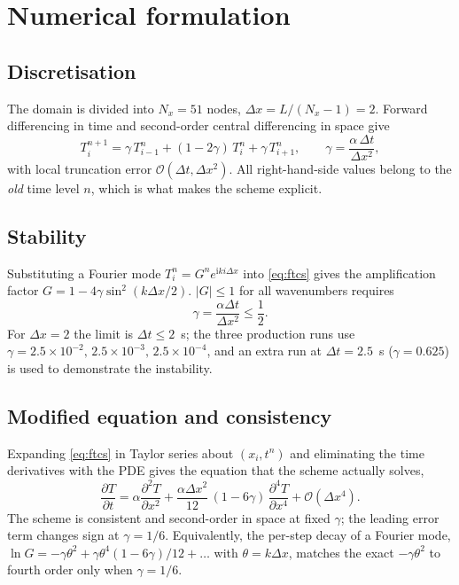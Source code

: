\section{Numerical formulation}
\subsection{Discretisation}
The domain is divided into $N_x=51$ nodes, $\Delta x=L/(N_x-1)=2$. Forward differencing in time and second-order central differencing in space give
\begin{equation}
T_i^{n+1} = \gamma\,T_{i-1}^{n} + (1-2\gamma)\,T_i^{n} + \gamma\,T_{i+1}^{n}, \qquad \gamma=\frac{\alpha\,\Delta t}{\Delta x^2}, \label{eq:ftcs}
\end{equation}
with local truncation error $\mathcal{O}(\Delta t,\Delta x^2)$. All right-hand-side values belong to the \emph{old} time level $n$, which is what makes the scheme explicit.

\subsection{Stability}
Substituting a Fourier mode $T_i^n=G^n e^{\mathrm{i}k i\Delta x}$ into \eqref{eq:ftcs} gives the amplification factor $G=1-4\gamma\sin^2(k\Delta x/2)$. $|G|\le1$ for all wavenumbers requires
\begin{equation}\gamma=\frac{\alpha\Delta t}{\Delta x^2}\le\frac12 .\end{equation}
For $\Delta x=2$ the limit is $\Delta t\le 2$~s; the three production runs use $\gamma=2.5\times10^{-2},\,2.5\times10^{-3},\,2.5\times10^{-4}$, and an extra run at $\Delta t=2.5$~s ($\gamma=0.625$) is used to demonstrate the instability.

\subsection{Modified equation and consistency}
Expanding \eqref{eq:ftcs} in Taylor series about $(x_i,t^n)$ and eliminating the time derivatives with the PDE gives the equation that the scheme actually solves,
\begin{equation}
\frac{\partial T}{\partial t}=\alpha\frac{\partial^2T}{\partial x^2}+\frac{\alpha\Delta x^2}{12}\,(1-6\gamma)\,\frac{\partial^4T}{\partial x^4}+\mathcal{O}(\Delta x^4).
\end{equation}
The scheme is consistent and second-order in space at fixed $\gamma$; the leading error term changes sign at $\gamma=1/6$. Equivalently, the per-step decay of a Fourier mode, $\ln G=-\gamma\theta^2+\gamma\theta^4(1-6\gamma)/12+\dots$ with $\theta=k\Delta x$, matches the exact $-\gamma\theta^2$ to fourth order only when $\gamma=1/6$.

